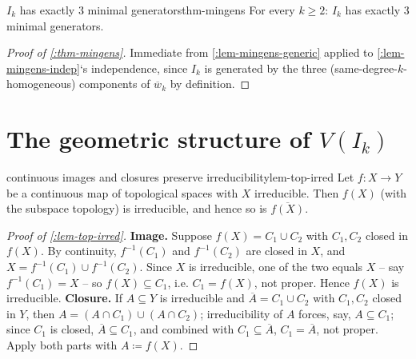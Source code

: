 \documentclass[a4paper,11pt]{scrartcl}
\begin{document}
\begin{theorem}{{}\(I_{k}\) has exactly 3 minimal generators}{thm-mingens} For every \(k \geq 2\): \(I_{k}\) has exactly 3 minimal generators.

\end{theorem} \protect{}\label{thm-mingens}{}

\begin{proof}[Proof of \cref{:thm-mingens}] Immediate from \cref{:lem-mingens-generic} applied to \cref{:lem-mingens-indep}`s independence, since \(I_{k}\) is generated by the three (same-degree-\(k\)-homogeneous) components of \({\overline{w}}_{k}\) by definition.

\end{proof}

\section{\texorpdfstring{The geometric structure of \(V\left( I_{k} \right)\)}{The geometric structure of V\textbackslash left( I\_\{k\} \textbackslash right)}}

\begin{lemma}{continuous images and closures preserve irreducibility}{lem-top-irred} Let \(f:X \rightarrow Y\) be a continuous map of topological spaces with \(X\) irreducible. Then \(f(X)\) (with the subspace topology) is irreducible, and hence so is \(\overline{f(X)}\).

\end{lemma} \protect{}\label{lem-top-irred}{}

\begin{proof}[Proof of \cref{:lem-top-irred}] \textbf{Image.} Suppose \(f(X) = C_{1} \cup C_{2}\) with \(C_{1},C_{2}\) closed in \(f(X)\). By continuity, \(f^{- 1}\left( C_{1} \right)\) and \(f^{- 1}\left( C_{2} \right)\) are closed in \(X\), and \(X = f^{- 1}\left( C_{1} \right) \cup f^{- 1}\left( C_{2} \right)\). Since \(X\) is irreducible, one of the two equals \(X\) -- say \(f^{- 1}\left( C_{1} \right) = X\) -- so \(f(X) \subseteq C_{1}\), i.e. \(C_{1} = f(X)\), not proper. Hence \(f(X)\) is irreducible. \textbf{Closure.} If \(A \subseteq Y\) is irreducible and \(\overline{A} = C_{1} \cup C_{2}\) with \(C_{1},C_{2}\) closed in \(Y\), then \(A = \left( A \cap C_{1} \right) \cup \left( A \cap C_{2} \right)\); irreducibility of \(A\) forces, say, \(A \subseteq C_{1}\); since \(C_{1}\) is closed, \(\overline{A} \subseteq C_{1}\), and combined with \(C_{1} \subseteq \overline{A}\), \(C_{1} = \overline{A}\), not proper. Apply both parts with \(A ≔ f(X)\).

\end{proof}
\end{document}
